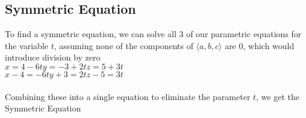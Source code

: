 \documentclass{article}
\begin{document}
\subsection*{Symmetric Equation}
To find a symmetric equation, we can solve all 3 of our parametric equations for the variable $t$, assuming none of the components of $\langle a,b,c\rangle$ are 0, which would introduce division by zero
\\$x=4-6t$\hfill$y=-3+2t$\hfill$z=5+3t$\hfill\null
\\[0.05in]$x-4=-6t$\hfill$y+3=2t$\hfill$z-5=3t$\hfill\null
\\[0.05in]\hfill{}\hfill{}\hfill\null
\\[0.05in] Combining these into a single equation to eliminate the parameter $t$, we get the Symmetric Equation \\[0.05in]\begin{center}\end{center}
\end{document}
